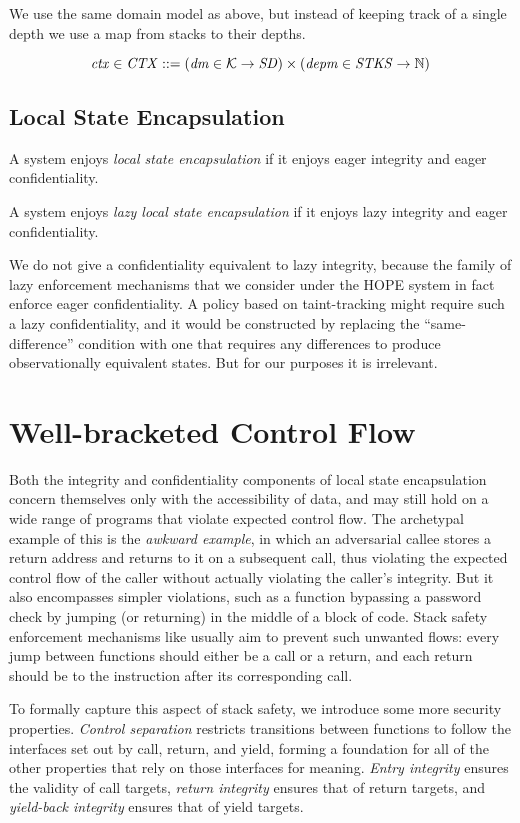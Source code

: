 \documentclass[acmsmall,review,anonymous]{acmart}\settopmatter{printfolios=true,printccs=false,printacmref=false}
\begin{document}
We use the same domain model as above, but instead of keeping track of a single depth
we use a map from stacks to their depths.

\[\mathit{ctx} \in \mathit{CTX} ::= (\mathit{dm} \in {\mathcal K} \rightarrow \mathit{SD}) \times
(\mathit{depm} \in \mathit{STKS} \rightarrow \mathbb{N})\]

\subsection{Local State Encapsulation}

 A system enjoys {\em local state encapsulation} if it enjoys eager integrity and
eager confidentiality.

 A system enjoys {\em lazy local state encapsulation} if it enjoys lazy integrity
and eager confidentiality.

We do not give a confidentiality equivalent to lazy integrity, because the family of lazy
enforcement mechanisms that we consider under the HOPE system in fact enforce eager confidentiality.
A policy based on taint-tracking might require such a lazy confidentiality, and it would be constructed
by replacing the ``same-difference'' condition with one that requires any differences to produce
observationally equivalent states. But for our purposes it is irrelevant.

\section{Well-bracketed Control Flow}
\label{sec:wbcf}

Both the integrity and confidentiality components of local state
encapsulation concern themselves only with the accessibility of data,
and may still hold on a wide range of programs that violate expected
control flow. The archetypal example of this is the {\em awkward example},
in which an adversarial callee stores a return address and returns to it
on a subsequent call, thus violating the expected control flow of the
caller without actually violating the caller's integrity. But it also
encompasses simpler violations, such as a function bypassing a password
check by jumping (or returning) in the middle of a block of code.
%
Stack safety enforcement mechanisms like \citet{Skorstengaard+19}
usually aim to prevent such unwanted flows: every jump between
functions should either be a call or a return, and each return should
be to the instruction after its corresponding call.

To formally capture this aspect of stack safety, we introduce some more
security properties. {\em Control separation} restricts transitions between
functions to follow the interfaces set out by call, return, and yield, forming
a foundation for all of the other properties that rely on those interfaces for
meaning. {\em Entry integrity} ensures the validity of call targets,
{\em return integrity} ensures that of return targets, and
{\em yield-back integrity} ensures that of yield targets.
\end{document}
